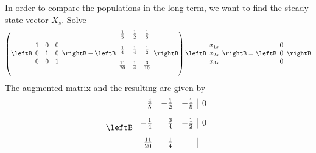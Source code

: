 \begin{solution}
In order to compare the populations in the long term, we want to find the steady state vector $X_s$. 
Solve
\begin{equation*}
\left( \leftB
\begin{array}{rrr}
1 & 0 & 0 \\
0 & 1 & 0 \\
0 & 0 & 1
\end{array}
\rightB -\leftB
\begin{array}{ccc}
\vspace{.05in} \frac{1}{5} & \vspace{.05in} \frac{1}{2} & \vspace{.05in}
\frac{1}{5} \\
\vspace{.05in} \frac{1}{4} & \vspace{.05in} \frac{1}{4} & \vspace{.05in}
\frac{1}{2} \\
\vspace{.05in} \frac{11}{20} & \vspace{.05in} \frac{1}{4} & \vspace{.05in}
\frac{3}{10}
\end{array}
\rightB \right) \leftB
\begin{array}{c}
x_{1s} \\
x_{2s} \\
x_{3s}
\end{array}
\rightB =\leftB
\begin{array}{c}
0 \\
0 \\
0
\end{array}
\rightB 
\end{equation*}
The augmented matrix and the resulting \rref \;are given by
\begin{equation*}
\leftB
\begin{array}{rrr|r}
\vspace{.05in} \frac{4}{5} & -\vspace{.05in} \frac{1}{2} & -\vspace{.05in}
\frac{1}{5} &  0 \\
-\vspace{.05in} \frac{1}{4} & \vspace{.05in} \frac{3}{4} & -\vspace{.05in}
\frac{1}{2} &  0 \\
-\vspace{.05in} \frac{11}{20} & -\vspace{.05in} \frac{1}{4} & \vspace{.05in}

\end{array}
\end{equation*}
\end{solution}
